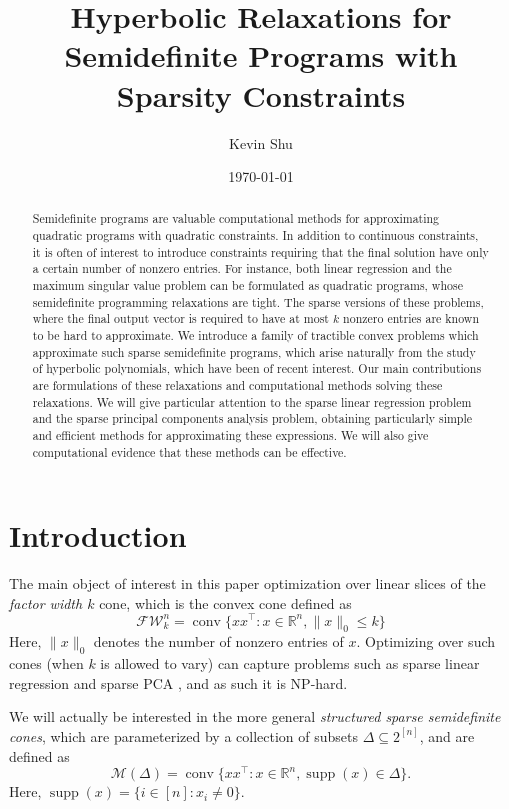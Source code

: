 \documentclass{amsart}
\title{Hyperbolic Relaxations for Semidefinite Programs with Sparsity Constraints}
\date{\today}
\author{Kevin Shu}
\theoremstyle{definition}
\newcommand{\R}{\mathbb{R}}
\newcommand{\FW}{\mathcal{F}\mathcal{W}}
\newcommand{\M}{\mathcal{M}}
\DeclareMathOperator*{\supp}{supp}
\DeclareMathOperator{\conv}{\operatorname{conv}}
\begin{document}
\begin{abstract}
    Semidefinite programs are valuable computational methods for approximating quadratic programs with quadratic constraints.
    In addition to continuous constraints, it is often of interest to introduce constraints requiring that the final solution have only a certain number of nonzero entries.
    For instance, both linear regression and the maximum singular value problem can be formulated as quadratic programs, whose semidefinite programming relaxations are tight.
    The sparse versions of these problems, where the final output vector is required to have at most $k$ nonzero entries are known to be hard to approximate.
    We introduce a family of tractible convex problems which approximate such sparse semidefinite programs, which arise naturally from the study of hyperbolic polynomials, which have been of recent interest.
    Our main contributions are formulations of these relaxations and computational methods solving these relaxations.
    We will give particular attention to the sparse linear regression problem and the sparse principal components analysis problem, obtaining particularly simple and efficient methods for approximating these expressions.
    We will also give computational evidence that these methods can be effective.
\end{abstract}

\maketitle

\section{Introduction}
The main object of interest in this paper optimization over linear slices of the \emph{factor width $k$} cone, which is the convex cone defined as 
\[
    \FW^n_k = \conv \{xx^{\intercal} : x \in \R^n, \|x\|_0 \le k\}
\]
Here, $\|x\|_0$ denotes the number of nonzero entries of $x$.
Optimizing over such cones (when $k$ is allowed to vary) can capture problems such as sparse linear regression \cite{TODO} and sparse PCA \cite{TODO}, and as such it is NP-hard.

We will actually be interested in the more general \emph{structured sparse semidefinite cones}, which are parameterized by a collection of subsets $\Delta \subseteq 2^{[n]}$, and are defined as
\[
    \M(\Delta) = \conv \{xx^{\intercal} : x \in \R^n, \supp(x) \in \Delta\}.
\]
Here, $\supp(x) = \{i \in [n] : x_i \neq 0\}$.
\end{document}
